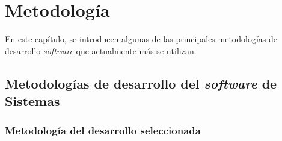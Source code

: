 \chapter{Metodología}
\label{chapter:metodologia}

En este capítulo, se introducen algunas de las principales metodologías de desarrollo \textit{software} que actualmente más se utilizan.

\section{Metodologías de desarrollo del \textit{software} de Sistemas}

\subsection*{Metodología del desarrollo seleccionada}

